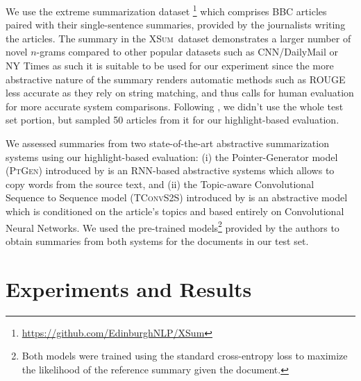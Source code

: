 \documentclass[11pt,a4paper]{article}
\newcommand\ptgen{\textsc{PtGen}}
\newcommand\tconv{\textsc{TConvS2S}}
\newcommand\xsum{\textsc{XSum}}
\begin{document}
We use the extreme summarization dataset \citep[\xsum,][]{narayan18xsum}\footnote{\url{https://github.com/EdinburghNLP/XSum}} which comprises BBC articles paired with their single-sentence summaries, provided by the journalists writing the articles. The summary in the \xsum\ dataset demonstrates a larger number of novel $n$-grams compared to other popular datasets such as CNN/DailyMail \citep{Hermann2015} or NY Times \citep{Sandhaus2008} as such it is suitable to be used for our experiment since the more abstractive nature of the summary renders automatic methods such as ROUGE less accurate as they rely on string matching, and thus calls for human evaluation for more accurate system comparisons. 
Following \citet{narayan18xsum}, we didn't use the whole test set portion, but sampled 50 articles from it for our highlight-based evaluation.  


We assessed summaries from two state-of-the-art abstractive summarization systems using our highlight-based evaluation: (i) the Pointer-Generator model (\ptgen) introduced by \citet{See2017} is an RNN-based abstractive systems which allows to copy words from the source text, and (ii) the Topic-aware Convolutional Sequence to Sequence model (\tconv) introduced by \citet{narayan18xsum} is an   abstractive model which is conditioned on the article's topics and based entirely on Convolutional Neural Networks.
We used the pre-trained models\footnote{Both models were trained using the standard cross-entropy loss to maximize the likelihood of the reference summary given the document.} provided by the authors to obtain summaries from both systems for the documents in our test set.


\section{Experiments and Results}
\label{sec:exp-res}
\end{document}
